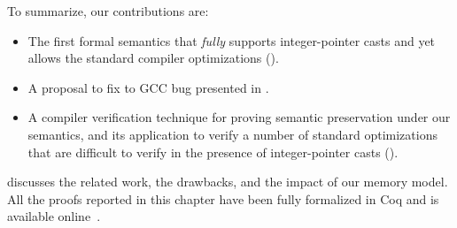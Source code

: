 \medskip \noindent
To summarize, our contributions are:
\begin{itemize}
\item The first formal semantics that \emph{fully} supports integer-pointer casts and yet allows the
  standard compiler optimizations ().

\item A proposal to fix to GCC bug presented in . 

\item A compiler verification technique for proving semantic preservation under our semantics, and its
  application to verify a number of standard optimizations that are difficult to verify in the
  presence of integer-pointer casts ().
\end{itemize}

\noindent {} discusses the related work, the drawbacks, and the impact
of our memory model.  All the proofs reported in this chapter have been fully formalized in Coq and
is available online~\cite{kang-phd-thesis-web}.

%
%
%
%



